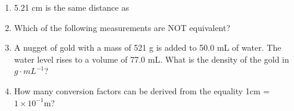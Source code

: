 \documentclass[main.tex]{subfiles}
\begin{document}
\begin{fullwidth}
\begin{multicols*}{2}
\begin{enumerate}
\item  5.21 cm is the same distance as 
\begin{enumerate}[label=(\alph*)]\vspace{-0.5cm}
\end{enumerate}
\item  Which of the following measurements are NOT equivalent? 
\begin{enumerate}[label=(\alph*)]\vspace{-0.5cm}
\end{enumerate}

\item A nugget of gold with a mass of 521 g is added to 50.0 mL of water.  The water level rises to a volume of 77.0 mL.  What is the density of the gold in $g\cdot mL^{-1}$? 
\begin{enumerate}[label=(\alph*)]\vspace{-0.5cm}
\end{enumerate}

\item How many conversion factors can be derived from the equality 1cm = $1\times 10^{-1}$m?
\begin{enumerate}[label=(\alph*)]\vspace{-0.5cm}
\end{enumerate}


\end{enumerate}
\end{multicols*}
\end{fullwidth}
\end{document}
